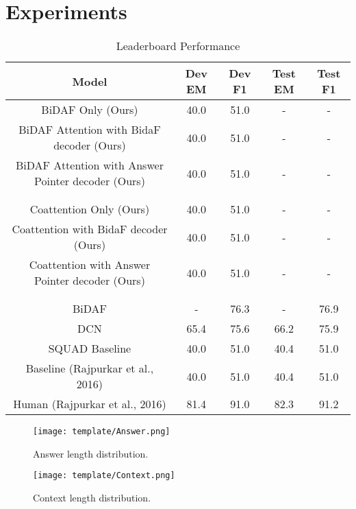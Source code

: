 \documentclass{article} %
\begin{document}
\section{Experiments}



\begin{table}[ht]
\caption{Leaderboard Performance} %
\centering %
\begin{tabular}{c c c c c} %
\hline\hline %
Model & Dev EM & Dev F1 & Test EM & Test F1 \\ [0.5ex] %
\hline %
BiDAF  Only (Ours) & 40.0 & 51.0 & - & -\\
BiDAF Attention with BidaF decoder (Ours) & 40.0 & 51.0 & - & -\\
BiDAF Attention with Answer Pointer decoder (Ours) & 40.0 & 51.0 & - & -\\
\\ \hline \\
Coattention Only (Ours) & 40.0 & 51.0 & - & -\\
Coattention with BidaF decoder (Ours) & 40.0 & 51.0 & - & -\\
Coattention with Answer Pointer decoder (Ours) & 40.0 & 51.0 & - & -\\
\\ \hline \\
BiDAF & - & 76.3 & - & 76.9\\
DCN  & 65.4 & 75.6 & 66.2 & 75.9\\
SQUAD Baseline & 40.0 & 51.0 & 40.4 & 51.0\\
Baseline (Rajpurkar et al., 2016) & 40.0 & 51.0 & 40.4 & 51.0\\
Human (Rajpurkar et al., 2016) & 81.4 & 91.0 & 82.3 & 91.2\\ [1ex] %
\hline %
\end{tabular}
\label{table:nonlin} %
\end{table}


\begin{figure}
\texttt{[image: template/Answer.png]}
\centering
\caption{Answer length distribution.}
\end{figure}



\begin{figure}
\texttt{[image: template/Context.png]}
\centering
\caption{Context length distribution.}
\end{figure}
\end{document}
